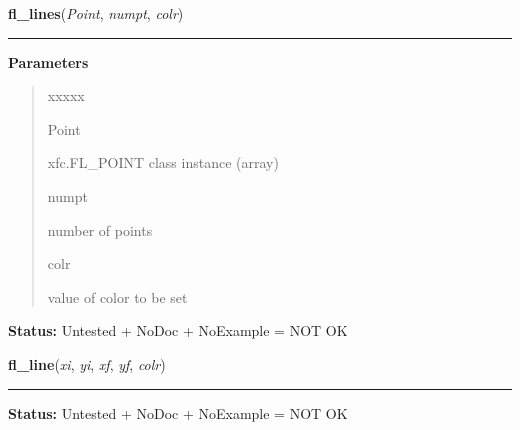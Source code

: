 \hspace{.8\funcindent}\begin{boxedminipage}{\funcwidth}

    \raggedright \textbf{fl\_lines}(\textit{Point}, \textit{numpt}, \textit{colr})

    \vspace{-1.5ex}

    \rule{\textwidth}{0.5\fboxrule}
\setlength{\parskip}{2ex}
\setlength{\parskip}{1ex}
      \textbf{Parameters}
      \vspace{-1ex}

      \begin{quote}
        \begin{Ventry}{xxxxx}

          \item[Point]

          xfc.FL\_POINT class instance (array)

          \item[numpt]

          number of points

          \item[colr]

          value of color to be set

        \end{Ventry}

      \end{quote}

\textbf{Status:} Untested + NoDoc + NoExample = NOT OK



    \end{boxedminipage}

    \label{xformslib:library:fl_line}

    \vspace{0.5ex}

\hspace{.8\funcindent}\begin{boxedminipage}{\funcwidth}

    \raggedright \textbf{fl\_line}(\textit{xi}, \textit{yi}, \textit{xf}, \textit{yf}, \textit{colr})

    \vspace{-1.5ex}

    \rule{\textwidth}{0.5\fboxrule}
\setlength{\parskip}{2ex}
\setlength{\parskip}{1ex}
\textbf{Status:} Untested + NoDoc + NoExample = NOT OK



    \end{boxedminipage}

